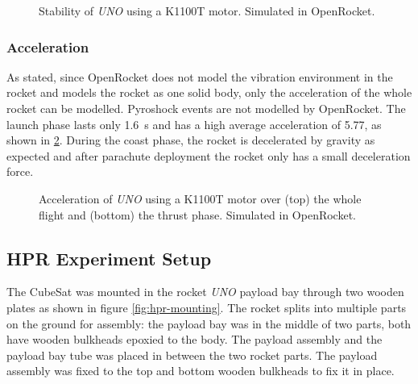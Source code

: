 \documentclass{report}
\begin{document}
\begin{figure}[H]
  
  \caption{Stability of \textit{UNO} using a K1100T motor. Simulated in OpenRocket.}
  \label{fig:openrocket-k-stability}
\end{figure}

\subsubsection{Acceleration}

As stated, since OpenRocket does not model the vibration environment in the rocket and models the rocket as one solid body, only the acceleration of the whole rocket can be modelled. Pyroshock events are not modelled by OpenRocket. The launch phase lasts only \SI{1.6}{\second} and has a high average acceleration of \SI{5.77}{\gacc}, as shown in \ref{fig:openrocket-k-acceleration}. During the coast phase, the rocket is decelerated by gravity as expected and after parachute deployment the rocket only has a small deceleration force.

\begin{figure}[H]
  \centering
  
  
  \caption{Acceleration of \textit{UNO} using a K1100T motor over (top) the whole flight and (bottom) the thrust phase. Simulated in OpenRocket.}
  \label{fig:openrocket-k-acceleration}
\end{figure}


\subsection{HPR Experiment Setup}

The CubeSat was mounted in the rocket \textit{UNO} payload bay through two wooden plates as shown in figure \ref{fig:hpr-mounting}. The rocket splits into multiple parts on the ground for assembly: the payload bay was in the middle of two parts, both have wooden bulkheads epoxied to the body. The payload assembly and the payload bay tube was placed in between the two rocket parts. The payload assembly was fixed to the top and bottom wooden bulkheads to fix it in place.
\end{document}

